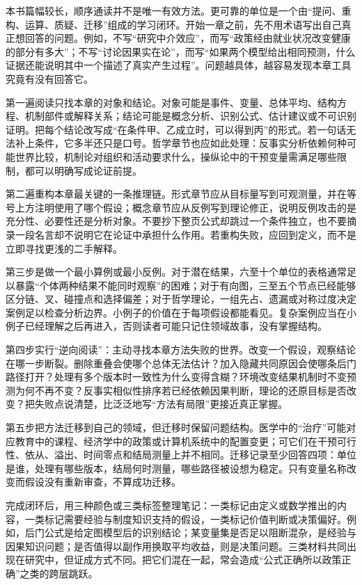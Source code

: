 本书篇幅较长，顺序通读并不是唯一有效方法。更可靠的单位是一个由“提问、重构、运算、质疑、迁移”组成的学习闭环。开始一章之前，先不用术语写出自己真正想回答的问题。例如，不写“研究中介效应”，而写“政策经由就业状况改变健康的部分有多大”；不写“讨论因果实在论”，而写“如果两个模型给出相同预测，什么证据还能说明其中一个描述了真实产生过程”。问题越具体，越容易发现本章工具究竟有没有回答它。

第一遍阅读只找本章的对象和结论。对象可能是事件、变量、总体平均、结构方程、机制部件或解释关系；结论可能是概念分析、识别公式、估计建议或不可识别证明。把每个结论改写成“在条件甲、乙成立时，可以得到丙”的形式。若一句话无法补上条件，它多半还只是口号。哲学章节也应如此处理：反事实分析依赖何种可能世界比较，机制论对组织和活动要求什么，操纵论中的干预变量需满足哪些限制，都可以明确写成论证前提。

第二遍重构本章最关键的一条推理链。形式章节应从目标量写到可观测量，并在等号上方注明使用了哪个假设；概念章节应从反例写到理论修正，说明反例攻击的是充分性、必要性还是分析对象。不要抄下整页公式却跳过一个条件独立，也不要摘录一段名言却不说明它在论证中承担什么作用。若重构失败，应回到定义，而不是立即寻找更浅的二手解释。

第三步是做一个最小算例或最小反例。对于潜在结果，六至十个单位的表格通常足以暴露“个体两种结果不能同时观察”的困难；对于有向图，三至五个节点已经能够区分链、叉、碰撞点和选择偏差；对于哲学理论，一组先占、遗漏或对称过度决定案例足以检查分析边界。小例子的价值在于每项假设都能看见。复杂案例应当在小例子已经理解之后再进入，否则读者可能只记住领域故事，没有掌握结构。

第四步实行“逆向阅读”：主动寻找本章方法失败的世界。改变一个假设，观察结论在哪一步断裂。删除重叠会使哪个总体无法估计？加入隐藏共同原因会使哪条后门路径打开？处理有多个版本时一致性为什么变得含糊？环境改变结果机制时不变预测为何不再不变？反事实相似性排序若已经依赖因果判断，理论的还原目标是否改变？把失败点说清楚，比泛泛地写“方法有局限”更接近真正掌握。

第五步把方法迁移到自己的领域，但迁移时保留问题结构。医学中的“治疗”可能对应教育中的课程、经济学中的政策或计算机系统中的配置变更；可它们在干预可行性、依从、溢出、时间零点和结局测量上并不相同。迁移记录至少回答四项：单位是谁，处理有哪些版本，结局何时测量，哪些路径被设想为稳定。只有变量名称改变而假设没有重新审查，不算成功迁移。

完成闭环后，用三种颜色或三类标签整理笔记：一类标记由定义或数学推出的内容，一类标记需要经验与制度知识支持的假设，一类标记价值判断或决策偏好。例如，后门公式是给定图模型后的识别结论；某变量集是否足以阻断混杂，是经验与因果知识问题；是否值得以副作用换取平均收益，则是决策问题。三类材料共同出现在研究中，但证成方式不同。把它们混在一起，常会造成“公式正确所以政策正确”之类的跨层跳跃。

